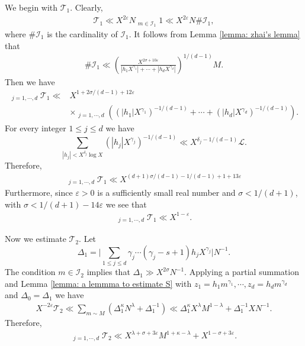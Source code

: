 \documentclass[12pt, reqno, twoside, letterpaper]{amsart}
\numberwithin{equation}{section}
\newcommand{\cT}{\ensuremath{\mathcal{T}}}
\theoremstyle{customthm}
\theoremstyle{customrem}
\begin{document}
We begin with $\cT_1$. Clearly,
\begin{align*}
\cT_1\ll X^{2\varepsilon}N\mathop{\sum_{m\sim M}}_{m\in\mathcal{I}_1}1
\ll X^{2\varepsilon}N\#\mathcal{I}_1,
\end{align*}
where $\#\mathcal{I}_1$ is the cardinality of $\mathcal{I}_1$.
It follows from Lemma \ref{lemma: zhai's lemma} that
\begin{align*}
\#\mathcal{I}_1\ll \left(\frac{X^{2\sigma+10\varepsilon}}{|h_1X^{\gamma_1}|+\cdots+
|h_dX^{\gamma_d}|}\right)^{1/(d-1)}M.
\end{align*}
Then we have
\begin{align*}
\mathop{\sum_{1<|h_j|<X^{\delta_j}\mathcal{L}}}_{j=1,\cdots,d}\cT_1
\ll &X^{1+2\sigma/(d-1)+12\varepsilon}\\
&\times\mathop{\sum_{1<|h_j|<X^{\delta_j}\mathcal{L}}}_{j=1,\cdots,d}
\left(\left(|h_1|X^{\gamma_1}\right)^{-1/(d-1)}
+\cdots+\left(|h_d|X^{\gamma_d}\right)^{-1/(d-1)}\right).
\end{align*}
For every integer $1\leqslant j\leqslant d$ we have
$$
\sum_{|h_j|<X^{\delta_j}\log X}\left(|h_j|X^{\gamma_j}\right)^{-1/(d-1)}
\ll X^{\delta_j-1/(d-1)}\mathcal{L}.
$$
Therefore,
\begin{align*}
\mathop{\sum_{1<|h_j|<X^{\delta_j}\mathcal{L}}}_{j=1,\cdots,d}\cT_1
\ll X^{(d+1)\sigma/(d-1)-1/(d-1)+1+13\varepsilon}
\end{align*}
Furthermore, since $\varepsilon>0$ is a sufficiently small real number
and $\sigma<1/(d+1)$, with $\sigma<1/(d+1)-14\varepsilon$ we see that
\begin{align}\label{eq: bound for T1}
\mathop{\sum_{1<|h_j|<X^{\delta_j}\mathcal{L}}}_{j=1,\cdots,d}\cT_1
\ll X^{1-\varepsilon}.
\end{align}

Now we estimate $\cT_2$. Let
$$
\Delta_1=\Bigg|\sum_{1\leqslant j\leqslant d}\gamma_j\cdots(\gamma_j-s+1)
h_jX^{\gamma_j}\Bigg|N^{-1}.
$$
The condition $m\in\mathcal{I}_2$ implies that $\Delta_1\gg X^{2\sigma} N^{-1}$.
Applying a partial summation and
Lemma \ref{lemma: a lemmma to estimate S} with $z_1=h_1m^{\gamma_1},\cdots,z_d=h_dm^{\gamma_d}$
and $\Delta_0=\Delta_1$ we have
\begin{align*}
X^{-2\varepsilon}\cT_2\ll\sum_{m\sim M}
\left(\Delta_1^{\kappa}N^{\lambda}+\Delta_1^{-1}\right)
\ll \Delta_1^{\kappa}X^{\lambda}M^{1-\lambda}+\Delta_1^{-1}XN^{-1}.
\end{align*}
Therefore,
\begin{align}\label{eq: bound for T2}
\mathop{\sum_{1<|h_j|<X^{\delta_j}\mathcal{L}}}_{j=1,\cdots,d}\cT_2
\ll X^{\lambda+\sigma+3\varepsilon}M^{1+\kappa-\lambda}+X^{1-\sigma+3\varepsilon}.
\end{align}
\end{document}
